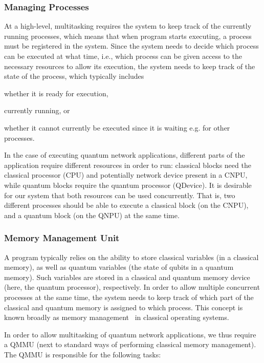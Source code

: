 \subsubsection{Managing Processes}

At a high-level, multitasking requires the system to keep track of the currently running processes, which means that when program starts executing, a process must be registered in the system. Since the system needs to decide which process can be executed at what time, i.e., which process can be given access to the necessary resources to allow its execution, the system needs to keep track of the state of the process, which typically includes
%
\begin{inlinelist}
\item whether it is ready for execution, 
\item currently running, or 
\item whether it cannot currently be executed since it is waiting e.g. for other processes.
\end{inlinelist}

In the case of executing quantum network applications, different parts of the application require different resources in order to run: classical blocks need the classical processor (\ac{CPU}) and potentially network device present in a \ac{CNPU}, while quantum blocks require the quantum processor (\ac{QDevice}). It is desirable for our system that both resources can be used concurrently. That is, two different processes should be able to execute a classical block (on the \ac{CNPU}), and a quantum block (on the \ac{QNPU}) at the same time.

\subsubsection{Memory Management Unit}

A program typically relies on the ability to store classical variables (in a classical memory), as well as quantum variables (the state of qubits in a quantum memory). Such variables are stored in a classical and quantum memory device (here, the quantum processor), respectively. In order to allow multiple concurrent processes at the same time, the system needs to keep track of which part of the classical and quantum memory is assigned to which process. This concept is known broadly as memory management~\cite[Section 1.7]{silberschatz_book_2014} in classical operating systems.

In order to allow multitasking of quantum network applications, we thus require a \ac{QMMU} (next to standard ways of performing classical memory management). The \ac{QMMU} is responsible for the following tasks:

